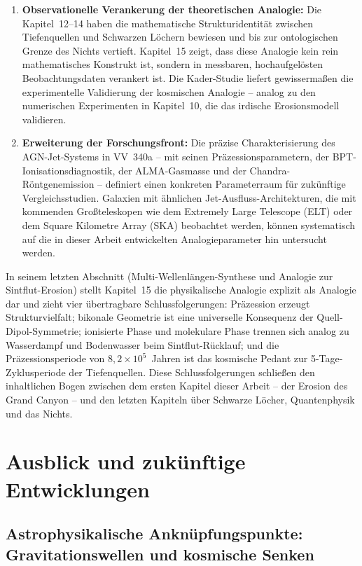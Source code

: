 ﻿\documentclass[12pt,a4paper]{report}
\begin{document}
\begin{enumerate}
	\item \textbf{Observationelle Verankerung der theoretischen Analogie:} Die Kapitel~12--14 haben die mathematische Strukturidentität zwischen Tiefenquellen und Schwarzen Löchern bewiesen und bis zur ontologischen Grenze des Nichts vertieft. Kapitel~15 zeigt, dass diese Analogie kein rein mathematisches Konstrukt ist, sondern in messbaren, hochaufgelösten Beobachtungsdaten verankert ist. Die Kader-Studie liefert gewissermaßen die experimentelle Validierung der kosmischen Analogie -- analog zu den numerischen Experimenten in Kapitel~10, die das irdische Erosionsmodell validieren.

	\item \textbf{Erweiterung der Forschungsfront:} Die präzise Charakterisierung des AGN-Jet-Systems in VV~340a -- mit seinen Präzessionsparametern, der BPT-Ionisationsdiagnos\-tik, der ALMA-Gasmasse und der Chandra-Röntgenemission -- definiert einen konkreten Parameterraum für zukünftige Vergleichsstudien. Galaxien mit ähnlichen Jet-Ausfluss-Architekturen, die mit kommenden Großteleskopen wie dem Extremely Large Telescope (ELT) oder dem Square Kilometre Array (SKA) beobachtet werden, können systematisch auf die in dieser Arbeit entwickelten Analogieparameter hin untersucht werden.
\end{enumerate}

In seinem letzten Abschnitt (\glqq Multi-Wellenlängen-Synthese und Analogie zur Sintflut-Erosion\grqq{}) stellt Kapitel~15 die physikalische Analogie explizit als Analogie dar und zieht vier übertragbare Schlussfolgerungen: Präzession erzeugt Strukturvielfalt; bikonale Geometrie ist eine universelle Konsequenz der Quell-Dipol-Symmetrie; ionisierte Phase und molekulare Phase trennen sich analog zu Wasserdampf und Bodenwasser beim Sintflut-Rücklauf; und die Präzessionsperiode von $8{,}2 \times 10^5$~Jahren ist das kosmische Pedant zur 5-Tage-Zyklusperiode der Tiefenquellen. Diese Schlussfolgerungen schließen den inhaltlichen Bogen zwischen dem ersten Kapitel dieser Arbeit -- der Erosion des Grand Canyon -- und den letzten Kapiteln über Schwarze Löcher, Quantenphysik und das Nichts.

\section{Ausblick und zukünftige Entwicklungen}

\subsection{Astrophysikalische Anknüpfungspunkte: Gravitationswellen und kosmische Senken}
\end{document}

